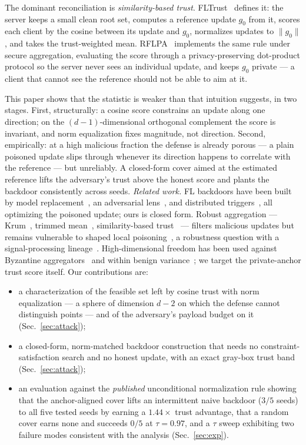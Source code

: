 \documentclass{article}
\begin{document}
The dominant reconciliation is \emph{similarity-based trust}. FLTrust~\cite{fltrust}
defines it: the server keeps a small clean root set, computes a reference update
$g_0$ from it, scores each client by the cosine between its update and $g_0$,
normalizes updates to $\|g_0\|$, and takes the trust-weighted mean.
RFLPA~\cite{rflpa} implements the same rule under secure aggregation, evaluating
the score through a privacy-preserving dot-product protocol so the server never
sees an individual update, and keeps $g_0$ private --- a client that cannot see
the reference should not be able to aim at it.

This paper shows that the statistic is weaker than that intuition suggests, in
two stages. First, structurally: a cosine score constrains an update along one
direction; on the $(d\!-\!1)$-dimensional orthogonal complement the score is
invariant, and norm equalization fixes magnitude, not direction. Second,
empirically: at a high malicious fraction the defense is already porous --- a
plain poisoned update slips through whenever its direction happens to correlate
with the reference --- but unreliably. A closed-form cover aimed at the estimated reference lifts the adversary's trust above the honest score and plants the backdoor consistently across seeds. \emph{Related work.} FL backdoors have been built by model
replacement~\cite{bagdasaryan}, an adversarial lens~\cite{bhagoji}, and
distributed triggers~\cite{dba,badnets}, all optimizing the poisoned update; ours
is closed form. Robust aggregation --- Krum~\cite{krum}, trimmed
mean~\cite{trimmedmean}, similarity-based trust~\cite{fltrust,rflpa} --- filters
malicious updates but remains vulnerable to shaped local poisoning~\cite{poisoning},
a robustness question with a signal-processing
lineage~\cite{spl_fl1}. High-dimensional freedom has been
used against Byzantine aggregators~\cite{hidra} and within benign
variance~\cite{alie}; we target the private-anchor trust score itself. Our contributions are:
\begin{itemize}\setlength\itemsep{0pt}
  \item[(i)] a characterization of the feasible set left by cosine trust with
    norm equalization --- a sphere of dimension $d-2$ on which the defense cannot
    distinguish points --- and of the adversary's payload budget on it
    (Sec.~\ref{sec:attack});
  \item[(ii)] a closed-form, norm-matched backdoor construction that needs no
    constraint-satisfaction search and no honest update, with an exact gray-box
    trust band (Sec.~\ref{sec:attack});
  \item[(iii)] an evaluation against the \emph{published} unconditional normalization rule
    showing that the anchor-aligned cover lifts an intermittent naive backdoor ($3/5$ seeds) to all five tested seeds by earning a $1.44\times$ trust advantage, that a random cover earns none and succeeds $0/5$ at $\tau{=}0.97$, and a $\tau$ sweep exhibiting two failure modes consistent with the analysis
    (Sec.~\ref{sec:exp}).
\end{itemize}
\end{document}

